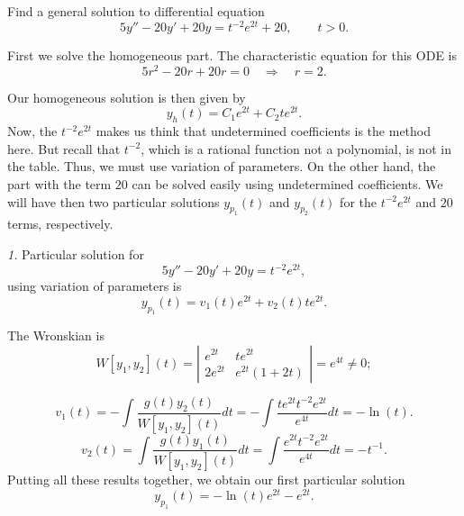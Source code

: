 \documentclass[11pt]{article}
\begin{document}
\begin{problem}
Find a general solution to differential equation
\begin{equation*}
5y'' -20 y' +20 y = t^{-2}e^{2t}+20, \qquad t>0.
\end{equation*}
\end{problem}
\begin{solution}
First we solve the homogeneous part. The characteristic equation for this ODE is 
\begin{equation*}
5r^2 -20 r+20r =0 \quad \Rightarrow \quad r = 2.
\end{equation*}

Our homogeneous solution is then given by
\begin{equation*}
y_{h}(t) = C_{1}e^{2t}+C_{2}te^{2t}.
\end{equation*}
Now, the $t^{-2}e^{2t}$ makes us think that undetermined coefficients is the method here. But recall that $t^{-2}$, which is a rational function not a polynomial, is not in the table. Thus, we must use variation of parameters. On the other hand, the part with the term $20$ can be solved easily using undetermined coefficients. We will have then two particular solutions $y_{p_{1}}(t)$ and $y_{p_{2}}(t)$ for the $t^{-2}e^{2t}$ and $20$ terms, respectively. 

\par \textsl{1.} Particular solution for
\[5y'' -20 y' +20 y = t^{-2}e^{2t},\] using variation of parameters is
\begin{equation*}
y_{p_{1}}(t) = v_{1}(t) e^{2t} + v_{2}(t) te^{2t}.
\end{equation*}

The Wronskian is
\begin{equation*}
W[y_{1},y_{2}](t) = \left| \begin{array}{cc} e^{2t} & te^{2t} \\
2e^{2t} & e^{2t}(1+2t) \end{array} \right| = e^{4t} \neq 0;
\end{equation*}


\begin{equation*}
v_{1}(t) = - \int \dfrac{g(t) y_{2}(t)}{W[y_{1},y_{2}](t)} dt = - \int \dfrac{te^{2t}t^{-2}e^{2t}}{e^{4t}}dt = -\ln(t).
\end{equation*}
\begin{equation*}
v_{2}(t) =  \int \dfrac{g(t) y_{1}(t)}{W[y_{1},y_{2}](t)} dt = \int \dfrac{e^{2t}t^{-2}e^{2t}}{e^{4t}}dt = -t^{-1}.
\end{equation*}
Putting all these results together, we obtain our first particular solution
\begin{equation*}
y_{p_{1}}(t) = -\ln (t)e^{2t} - e^{2t}.
\end{equation*}


\end{solution}
\end{document}
